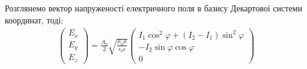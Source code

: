 Розглянемо вектор напруженості електричного поля в базису Декартової 
системи координат, тоді: 
%
%
%
\begin{equation} \begin{aligned} \label{eq:Exyz}
\left( \begin{array}{c} E_x \\ E_y \\ E_z \end{array} \right) = 
\frac{A_0}{2}  \sqrt{\frac{\mu_0 \mu}{\epsilon_0 \epsilon}} 
\left( \begin{array}{c} 
I_1 \cos^2 \varphi + (I_2 - I_1) \sin^2 \varphi \\
- I_2 \sin \varphi \cos \varphi \\
0
\end{array} \right)
\end{aligned} \end{equation}

